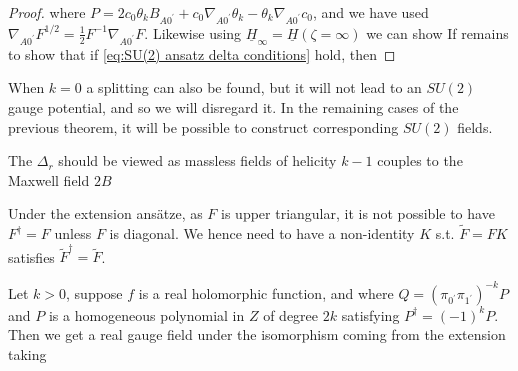 \documentclass{article}
\begin{document}
\begin{proof}
{}
where $P=2c_0 \theta_k B_{A0^\prime}+c_0 \nabla_{A0^\prime} \theta_k - \theta_k \nabla_{A0^\prime} c_0$, and we have used $\nabla_{A0^\prime} F^{1/2} = \frac{1}{2}F^{-1} \nabla_{A0^\prime} F$. Likewise using $\underline{H}_\infty = \underline{H}(\zeta=\infty)$ we can show
If remains to show that if \ref{eq:SU(2) ansatz delta conditions} hold, then 
\end{proof}

\begin{remark}
	When $k=0$ a splitting can also be found, but it will not lead to an $SU(2)$ gauge potential, and so we will disregard it. In the remaining cases of the previous theorem, it will be possible to construct corresponding $SU(2)$ fields. 
\end{remark}

\begin{remark}
	The $\Delta_r$ should be viewed as massless fields of helicity $k-1$ couples to the Maxwell field $2B$ 
\end{remark}

\begin{remark}
	Under the extension ans\"atze, as $F$ is upper triangular, it is not possible to have $F^\dagger=F$ unless $F$ is diagonal. We hence need to have a non-identity $K$ s.t. $\tilde{F} = FK$ satisfies $\tilde{F}^\dagger = \tilde{F}$. 
\end{remark}
\begin{example}\label{ex:example extension giving SU(2)}
	Let $k>0$, suppose $f$ is a real holomorphic function, and 
where $Q = (\pi_{0^\prime}\pi_{1^\prime})^{-k} P$ and $P$ is a homogeneous polynomial in $Z$ of degree $2k$ satisfying $P^\dagger = (-1)^kP$. Then we get a real gauge field under the isomorphism coming from the extension taking 
\end{example}
\end{document}
